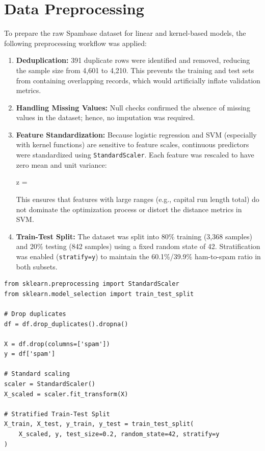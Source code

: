 \documentclass[12pt,a4paper]{article}
\begin{document}
\section{Data Preprocessing}
To prepare the raw Spambase dataset for linear and kernel-based models, the following preprocessing workflow was applied:
\begin{enumerate}
    \item \textbf{Deduplication:} 391 duplicate rows were identified and removed, reducing the sample size from 4,601 to 4,210. This prevents the training and test sets from containing overlapping records, which would artificially inflate validation metrics.
    \item \textbf{Handling Missing Values:} Null checks confirmed the absence of missing values in the dataset; hence, no imputation was required.
    \item \textbf{Feature Standardization:} Because logistic regression and SVM (especially with kernel functions) are sensitive to feature scales, continuous predictors were standardized using \texttt{StandardScaler}. Each feature was rescaled to have zero mean and unit variance:
    \begin{equation{}}
        z = 
    \end{equation{}}
    This ensures that features with large ranges (e.g., capital run length total) do not dominate the optimization process or distort the distance metrics in SVM.
    \item \textbf{Train-Test Split:} The dataset was split into 80\% training (3,368 samples) and 20\% testing (842 samples) using a fixed random state of 42. Stratification was enabled (\texttt{stratify=y}) to maintain the 60.1\%/39.9\% ham-to-spam ratio in both subsets.
\end{enumerate}

\begin{lstlisting}[caption={Feature Scaling and Dataset Partitioning Code}]
from sklearn.preprocessing import StandardScaler
from sklearn.model_selection import train_test_split

# Drop duplicates
df = df.drop_duplicates().dropna()

X = df.drop(columns=['spam'])
y = df['spam']

# Standard scaling
scaler = StandardScaler()
X_scaled = scaler.fit_transform(X)

# Stratified Train-Test Split
X_train, X_test, y_train, y_test = train_test_split(
    X_scaled, y, test_size=0.2, random_state=42, stratify=y
)
\end{lstlisting}
\end{document}
